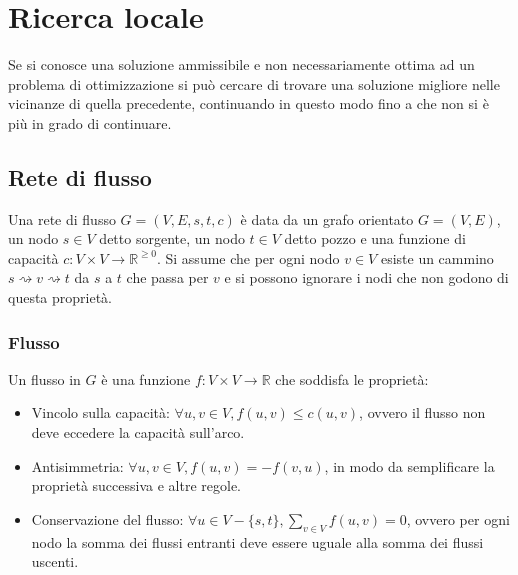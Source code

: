 \chapter{Ricerca locale}
Se si conosce una soluzione ammissibile e non necessariamente ottima ad un problema di ottimizzazione si pu\`o cercare di trovare una soluzione migliore nelle vicinanze di quella
precedente, continuando in questo modo fino a che non si \`e pi\`u in grado di continuare.\\

\section{Rete di flusso}
Una rete di flusso $G=(V, E, s, t, c)$ \`e data da un grafo orientato $G=(V, E)$, un nodo $s\in V$ detto sorgente, un nodo $t\in V$ detto pozzo e una funzione di capacit\`a $c:V\times V
\rightarrow\mathbb{R}^{\ge 0}$. Si assume che per ogni nodo $v\in V$ esiste un cammino $s \rightsquigarrow v \rightsquigarrow t$ da $s$ a $t$ che passa per $v$ e si possono ignorare i 
nodi che non godono di questa propriet\`a.
\subsection{Flusso}
Un flusso in $G$ \`e una funzione $f:V\times V\rightarrow\mathbb{R}$ che soddisfa le propriet\`a:
\begin{itemize}
	\item Vincolo sulla capacit\`a: $\forall u, v\in V, f(u, v)\le c(u, v)$, ovvero il flusso non deve eccedere la capacit\`a sull'arco.
	\item Antisimmetria: $\forall u, v\in V, f(u, v) = -f(v, u)$, in modo da semplificare la propriet\`a successiva e altre regole.
	\item Conservazione del flusso: $\forall u\in V - \{s, t\}, \sum\limits_{v\in V} f(u, v) = 0$, ovvero per ogni nodo la somma dei flussi entranti deve essere uguale alla somma dei
		flussi uscenti. 
\end{itemize}
